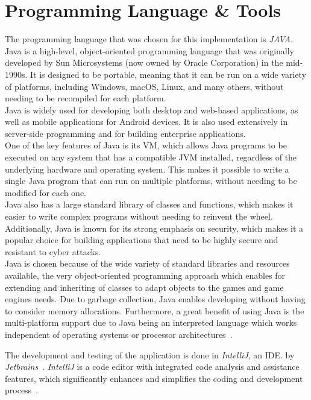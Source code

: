 \section{Programming Language \& Tools}\label{sec:programming-language}
The programming language that was chosen for this implementation is \textit{JAVA}.
Java is a high-level, object-oriented programming language that was originally developed by Sun Microsystems (now owned by Oracle Corporation) in the mid-1990s.
It is designed to be portable, meaning that it can be run on a wide variety of platforms, including Windows, macOS,
Linux, and many others, without needing to be recompiled for each platform.
\\
Java is widely used for developing both desktop and web-based applications, as well as mobile applications for Android devices.
It is also used extensively in server-side programming and for building enterprise applications.
\\
One of the key features of Java is its \gls{VM}, which allows Java programs to be executed on any system that has a compatible JVM installed, regardless of the underlying hardware and operating system.
This makes it possible to write a single Java program that can run on multiple platforms, without needing to be modified for each one.
\\
Java also has a large standard library of classes and functions, which makes it easier to write complex programs without needing to reinvent the wheel.
Additionally, Java is known for its strong emphasis on security, which makes it a popular choice for building applications that need to be highly secure
and resistant to cyber attacks.
\\
Java is chosen because of the wide variety of standard libraries and resources available, the very object-oriented programming approach which enables for
extending and inheriting of classes to adapt objects to the games and game engines needs.
Due to garbage collection, Java enables developing without having to consider memory allocations.
Furthermore, a great benefit of using Java is the multi-platform support due to Java being an interpreted language which works
independent of operating systems or processor architectures~\cite{JAVA}.

The development and testing of the application is done in \textit{IntelliJ}, an \gls{IDE}.
by \textit{Jetbrains}~\cite{intellij}.
\textit{IntelliJ} is a code editor with integrated code analysis and assistance features, which significantly
enhances and simplifies the coding and development process~\cite{intellij}.


